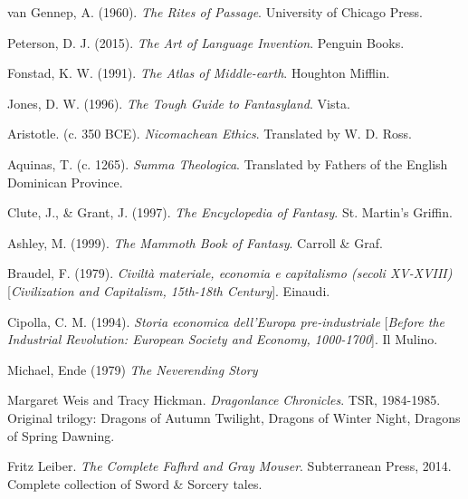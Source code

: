 van Gennep, A. (1960).
\textit{The Rites of Passage}.
University of Chicago Press.

Peterson, D. J. (2015).
\textit{The Art of Language Invention}.
Penguin Books.

Fonstad, K. W. (1991).
\textit{The Atlas of Middle-earth}.
Houghton Mifflin.

Jones, D. W. (1996).
\textit{The Tough Guide to Fantasyland}.
Vista.

Aristotle. (c. 350 BCE).
\textit{Nicomachean Ethics}.
Translated by W. D. Ross.

Aquinas, T. (c. 1265).
\textit{Summa Theologica}.
Translated by Fathers of the English Dominican Province.

Clute, J., \& Grant, J. (1997).
\textit{The Encyclopedia of Fantasy}.
St. Martin's Griffin.

Ashley, M. (1999).
\textit{The Mammoth Book of Fantasy}.
Carroll \& Graf.

Braudel, F. (1979).
\textit{Civiltà materiale, economia e capitalismo (secoli XV-XVIII)}
[\textit{Civilization and Capitalism, 15th-18th Century}].
Einaudi.

Cipolla, C. M. (1994).
\textit{Storia economica dell'Europa pre-industriale}
[\textit{Before the Industrial Revolution: European Society and Economy, 1000-1700}].
Il Mulino.

Michael, Ende (1979)
\textit{The Neverending Story}

Margaret Weis and Tracy Hickman.
\textit{Dragonlance Chronicles}.
TSR, 1984-1985.
Original trilogy: Dragons of Autumn Twilight, Dragons of Winter Night, Dragons of Spring Dawning.

Fritz Leiber.
\textit{The Complete Fafhrd and Gray Mouser}.
Subterranean Press, 2014.
Complete collection of Sword \& Sorcery tales.

